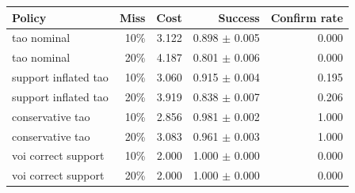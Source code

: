 \begin{tabular}{lrrrr}
\toprule
Policy & Miss & Cost & Success & Confirm rate \\
\midrule
tao nominal & 10\% & 3.122 & 0.898 $\pm$ 0.005 & 0.000 \\
tao nominal & 20\% & 4.187 & 0.801 $\pm$ 0.006 & 0.000 \\
support inflated tao & 10\% & 3.060 & 0.915 $\pm$ 0.004 & 0.195 \\
support inflated tao & 20\% & 3.919 & 0.838 $\pm$ 0.007 & 0.206 \\
conservative tao & 10\% & 2.856 & 0.981 $\pm$ 0.002 & 1.000 \\
conservative tao & 20\% & 3.083 & 0.961 $\pm$ 0.003 & 1.000 \\
voi correct support & 10\% & 2.000 & 1.000 $\pm$ 0.000 & 0.000 \\
voi correct support & 20\% & 2.000 & 1.000 $\pm$ 0.000 & 0.000 \\
\bottomrule
\end{tabular}
